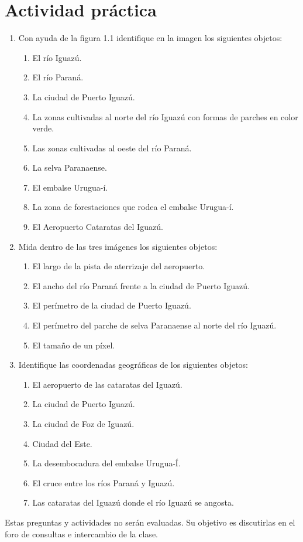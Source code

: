 \section{Actividad práctica}

\begin{enumerate}
  \item Con ayuda de la figura 1.1 identifique en la imagen los siguientes objetos:
  \begin{enumerate}
    \item El río Iguazú.
    \item El río Paraná.
    \item La ciudad de Puerto Iguazú.
    \item La zonas cultivadas al norte del río Iguazú con formas de parches en color verde.
    \item Las zonas cultivadas al oeste del río Paraná.
    \item La selva Paranaense.
    \item El embalse Urugua-í.
    \item La zona de forestaciones que rodea el embalse Urugua-í.
    \item El Aeropuerto Cataratas del Iguazú.
  \end{enumerate}

  \item Mida dentro de las tres imágenes los siguientes objetos:
  \begin{enumerate}
    \item El largo de la pista de aterrizaje del aeropuerto.
    \item El ancho del río Paraná frente a la ciudad de Puerto Iguazú.
    \item El perímetro de la ciudad de Puerto Iguazú.
    \item El perímetro del parche de selva Paranaense al norte del río Iguazú.
    \item El tamaño de un píxel.
  \end{enumerate}

  \item Identifique las coordenadas geográficas de los siguientes objetos:
  \begin{enumerate}
    \item El aeropuerto de las cataratas del Iguazú.
    \item La ciudad de Puerto Iguazú.
    \item La ciudad de Foz de Iguazú.
    \item Ciudad del Este.
    \item La desembocadura del embalse Urugua-Í.
    \item El cruce entre los ríos Paraná y Iguazú.
    \item Las cataratas del Iguazú donde el río Iguazú se angosta.
  \end{enumerate}
\end{enumerate}

Estas preguntas y actividades no serán evaluadas. Su objetivo es discutirlas en el foro de consultas e intercambio de la clase.
